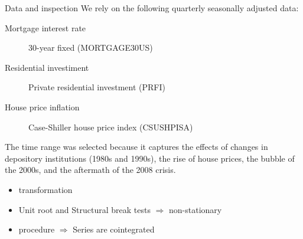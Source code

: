 \documentclass[10pt]{beamer}
\begin{document}
\begin{frame}[label={sec:org9cb64b4}]{Data and inspection}
We rely on the following quarterly seasonally adjusted data:
\begin{description}
\item[{Mortgage interest rate}] 30-year fixed (MORTGAGE30US)
\item[{Residential investiment}] Private residential investment (PRFI)
\item[{House price inflation}] Case-Shiller house price index (CSUSHPISA)
\end{description}

The time range was selected because it captures the effects of changes in depository institutions (1980s and 1990s), the rise of house prices, the bubble of the 2000s, and the aftermath of the 2008 crisis.

\begin{itemize}
\item \textcite{yeo_new_2000} transformation
\item Unit root and Structural break tests \(\Rightarrow\) non-stationary
\item \textcite{johansen_estimation_1991} procedure \(\Rightarrow\) Series are cointegrated
\end{itemize}
\end{frame}
\end{document}
